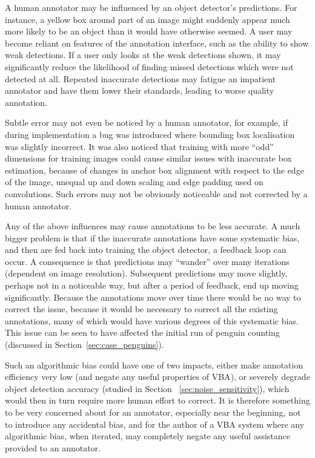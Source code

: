 A human annotator may be influenced by an object detector's predictions. For instance, a yellow box around part of an image might suddenly appear much more likely to be an object than it would have otherwise seemed. A user may become reliant on features of the annotation interface, such as the ability to show weak detections. If a user only looks at the weak detections shown, it may significantly reduce the likelihood of finding missed detections which were not detected at all. Repeated inaccurate detections may fatigue an impatient annotator and have them lower their standards, leading to worse quality annotation. 

Subtle error may not even be noticed by a human annotator, for example,  if during implementation a bug was introduced where bounding box localisation was slightly incorrect. It was also noticed that training with more ``odd'' dimensions for training images could cause similar issues with inaccurate box estimation, because of changes in anchor box alignment with respect to the edge of the image, unequal up and down scaling and edge padding used on convolutions. Such errors may not be obviously noticeable and not corrected by a human annotator.
 
Any of the above influences may cause annotations to be less accurate. A much bigger problem is that if the inaccurate annotations have some systematic bias, and then are fed back into training the object detector, a feedback loop can occur. A consequence is that predictions may ``wander'' over many iterations (dependent on image resolution). Subsequent predictions may move slightly, perhaps not in a noticeable way, but after a period of feedback, end up moving significantly. Because the annotations move over time there would be no way to correct the issue, because it would be necessary to correct all the existing annotations, many of which would have various degrees of this systematic bias. This issue can be seen to have affected the initial run of penguin counting (discussed in Section~\ref{sec:case_penguins}).  

Such an algorithmic bias could have one of two impacts, either make annotation efficiency very low (and negate any useful properties of \gls{VBA}), or severely degrade object detection accuracy (studied in Section~ \ref{sec:noise_sensitivity}), which would then in turn require more human effort to correct. It is therefore something to be very concerned about for an annotator, especially near the beginning, not to introduce any accidental bias, and for the author of a \gls{VBA} system where any algorithmic bias, when iterated, may completely negate any useful assistance provided to an annotator.


